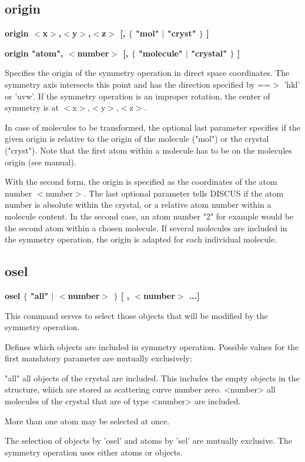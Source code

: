 \subsection*{origin}
{\bf origin $ <$x$> $,$ <$y$> $,$ <$z$> $ [, $ \{$ "mol" $| $ "cryst" $\} $ ] \par }
{\bf origin "atom", $ <$number$> $ [, $ \{$ "molecule" $| $ "crystal" $\} $ ] \par }
\par
\vspace{3pt}
Specifies the origin of the symmetry operation in direct space coordinates. 
The symmetry axis intersects this point and has the direction specified 
by ==$> $ 'hkl' or 'uvw'. If the symmetry operation is an improper rotation, 
the center of symmetry is at $ <$x$> $,$ <$y$> $,$ <$z$> $. 
\par
In case of molecules to be transformed, the optional last parameter 
specifies if the given origin is relative to the origin of the 
molecule ("mol") or the crystal ("cryst"). Note that the first 
atom within a molecule has to be on the molecules origin (see manual). 
\par
With the second form, the origin is specified as the coordinates of 
the atom number $ <$number$> $. 
The last optional parameter tells DISCUS if the atom number is 
absolute within the crystal, or a relative atom number within a 
molecule content. 
In the second case, an atom number "2" for example would be the second 
atom within a chosen molecule. If several molecules are included in the 
symmetry operation, the origin is adapted for each individual molecule. 
\par
\subsection*{osel}
{\bf osel $ \{$ "all" $| $ $ <$number$> $ $\} $ [ , $ <$number$> $ ...] \par }
\par
\vspace{3pt}
This command serves to select 
those objects that will be modified by the symmetry operation. 
\par
Defines which objects are included in symmetry operation. Possible values 
for the first mandatory parameter are mutually exclusively: 
\par
\begin{MacVerbatim}
"all"     all objects of the crystal are included.
          This includes the empty objects in the structure, which are
          stored as scattering curve number zero.
<number>  all molecules of the crystal that are of type <number>
          are included.
\end{MacVerbatim}
More than one atom may be selected at once. 
\par
The selection of objects by 'osel' and atoms by 'sel' are mutually 
exclusive. The symmetry operation uses either atoms or objects. 
